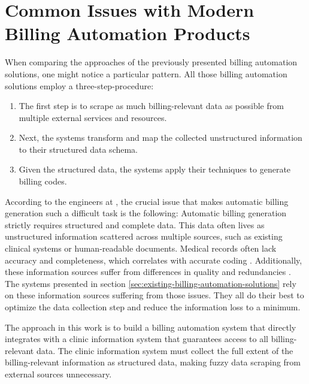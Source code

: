 \section{Common Issues with Modern Billing Automation Products}\label{sec:common-issues-with-modern-billing-automation-products}
When comparing the approaches of the previously presented billing automation solutions, one might notice a particular pattern.
All those billing automation solutions employ a three-step-procedure:
\begin{enumerate}
    \item The first step is to scrape as much billing-relevant data as possible from multiple external services and resources.
    \item Next, the systems transform and map the collected unstructured information to their structured data schema.
    \item Given the structured data, the systems apply their techniques to generate billing codes.
\end{enumerate}

According to the engineers at \AV, the crucial issue that makes automatic billing generation such a difficult task is the following:
Automatic billing generation strictly requires structured and complete data.
This data often lives as unstructured information scattered across multiple sources, such as existing clinical systems or human-readable documents.
Medical records often lack accuracy and completeness, which correlates with accurate coding \cite{Farhan2005Documentation}.
Additionally, these information sources suffer from differences in quality and redundancies \cite{Scheurwegs2017Selecting}.
The systems presented in section \ref{sec:existing-billing-automation-solutions} rely on these information sources suffering from those issues.
They all do their best to optimize the data collection step and reduce the information loss to a minimum.

The approach in this work is to build a billing automation system that directly integrates with a clinic information system that guarantees access to all billing-relevant data.
The clinic information system must collect the full extent of the billing-relevant information as structured data, making fuzzy data scraping from external sources unnecessary.
